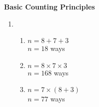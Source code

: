 \begin{center}
\textbf{Basic Counting Principles}\\
\end{center}

\vspace*{1ex}

{\begin{enumerate}[label = \arabic*. ]
\item %
\begin{enumerate}[label = \alph*. ]
\item %
$n = 8 + 7 + 3 $ \redcheck \\ 
$n = 18 $ ways \redcheck \\ 

\item %
$n = 8 \times 7 \times 3 $ \redcheck \\ 
$n = 168 $ ways \redcheck \\ 

\item %
$n = 7 \times (8+3) $ \redcheck \\ 
$n = 77 $ ways \redcheck \\ 


\end{enumerate}
\end{enumerate}}
